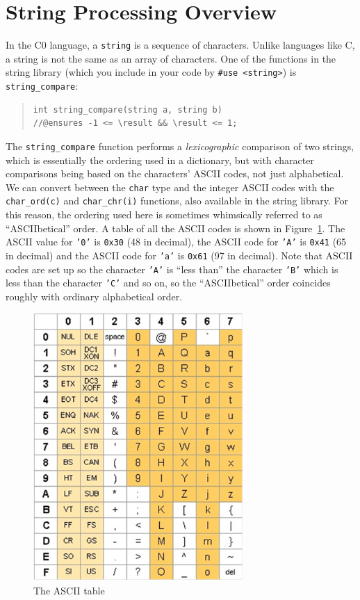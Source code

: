 \documentclass[12pt]{exam}
\begin{document}
\section{String Processing Overview}
\label{sec:strings}

In the C0 language, a \lstinline"string" is a sequence of
characters. Unlike languages like C, a string is not the same as an
array of characters. One of the functions in the string library
(which you include in your code by \lstinline+#use <string>+) is
\lstinline'string_compare':
\begin{quote}
\begin{lstlisting}[numbers=none]
int string_compare(string a, string b)
//@ensures -1 <= \result && \result <= 1;
\end{lstlisting}
\end{quote}
The \lstinline"string_compare" function performs a \emph{lexicographic}
comparison of two strings, which is essentially the ordering used in a
dictionary, but with character comparisons being based on the characters'
ASCII codes, not just alphabetical. We can convert between the
\lstinline'char' type and the integer ASCII codes with the
\lstinline'char_ord(c)' and \lstinline'char_chr(i)' functions, also available
in the string library.  For this reason, the ordering used here is sometimes
whimsically referred to as ``ASCIIbetical'' order.  A table of all the ASCII
codes is shown in Figure~\ref{fig:asciitable}.  The ASCII value for
\texttt{'0'} is \lstinline'0x30' (48 in decimal), the ASCII code for
\texttt{'A'} is \lstinline'0x41' (65 in decimal) and the ASCII code for
\texttt{'a'} is \lstinline'0x61' (97 in decimal). Note that ASCII codes are
set up so the character \texttt{'A'} is ``less than'' the character
\texttt{'B'} which is less than the character \texttt{'C'} and so on, so the
``ASCIIbetical'' order coincides roughly with ordinary alphabetical order.

\bigskip
\bigskip

\begin{figure}[hb]
\centering
    \includegraphics[width=80mm]{img/asciitable.png}
\caption{The ASCII table}
\label{fig:asciitable}
\end{figure}
\end{document}
